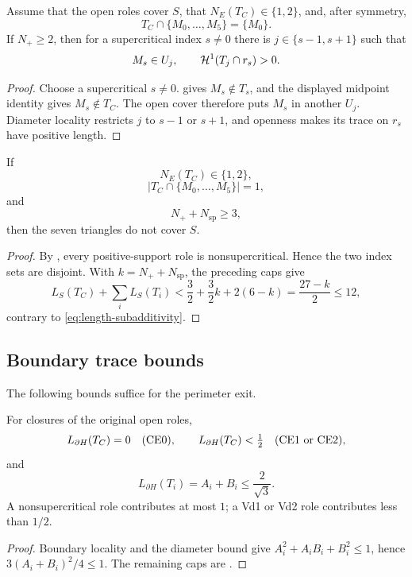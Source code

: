 \begin{lemma}
\label{lem:positive-support-rescuer}
Assume that the open roles cover $S$, that $N_E(T_C)\in\{1,2\}$, and,
after symmetry,
\[
 T_C\cap\{M_0,\ldots,M_5\}=\{M_0\}.
\]
If $N_+\ge2$, then for a supercritical index $s\ne0$ there is
$j\in\{s-1,s+1\}$ such that
\[
 M_s\in U_j,
 \qquad \mathcal H^1(T_j\cap r_s)>0.
\]
\end{lemma}

\begin{proof}
Choose a supercritical $s\ne0$.   gives
$M_s\notin T_s$, and the displayed midpoint identity gives
$M_s\notin T_C$.  The open cover therefore puts $M_s$ in another $U_j$.
Diameter locality restricts $j$ to $s-1$ or $s+1$, and openness makes its
trace on $r_s$ have positive length.
\end{proof}

\begin{theorem}
\label{thm:common-skeleton-count}
If
\[
 N_E(T_C)\in\{1,2\},
\]
\[
 \left|T_C\cap\{M_0,\ldots,M_5\}\right|=1,
\]
and
\begin{equation}
 N_++N_{\mathrm{sp}}\ge3,
 \label{eq:common-skeleton-count}
\end{equation}
then the seven triangles do not cover $S$.
\end{theorem}

\begin{proof}
By , every
positive-support role is nonsupercritical. Hence the two index sets are disjoint. With $k=N_++N_{\mathrm{sp}}$,
the preceding caps give
\[
 L_S(T_C)+\sum_iL_S(T_i)
 <\frac32+\frac32k+2(6-k)=\frac{27-k}{2}\le12,
\]
contrary to \eqref{eq:length-subadditivity}.
\end{proof}

\subsection{Boundary trace bounds}

The following bounds suffice for the perimeter exit.

\begin{theorem}
\label{thm:boundary-trace-table}
For closures of the original open roles,
\[
 L_{\partial H}(T_C)=0\quad(\mathrm{CE0}),\qquad
 L_{\partial H}(T_C)<\tfrac12\quad(\mathrm{CE1}\text{ or }\mathrm{CE2}),
\]
and
\begin{equation}
 L_{\partial H}(T_i)=A_i+B_i\le\frac2{\sqrt3}.
 \label{eq:vertex-boundary-locality}
\end{equation}
A nonsupercritical role contributes at most $1$; a Vd1 or Vd2 role
contributes less than $1/2$.
\end{theorem}
\begin{proof}
Boundary locality and the diameter bound give
$A_i^2+A_iB_i+B_i^2\le1$, hence
$3(A_i+B_i)^2/4\le1$. The remaining caps are
.
\end{proof}

